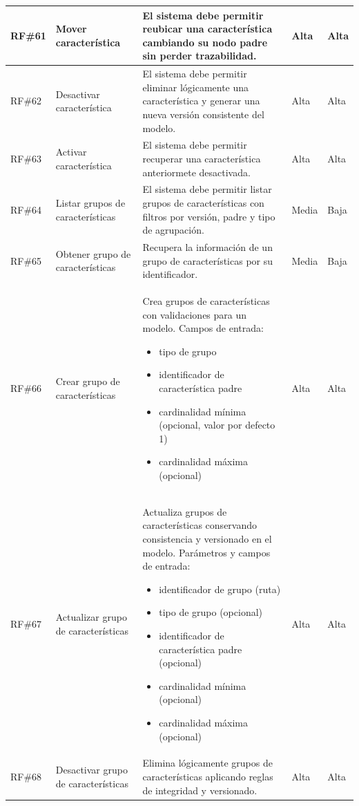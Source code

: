 \begin{longtable}{|p{1cm}|p{4cm}|p{5.2cm}|p{1.9cm}|p{1.9cm}|}
	\rowcolor[HTML]{EDEBF1}
	\ac{RF}\#61 & Mover característica & El sistema debe permitir reubicar una característica cambiando su nodo padre sin perder trazabilidad. & Alta & Alta \\
	\hline
	\ac{RF}\#62 & Desactivar característica & El sistema debe permitir eliminar lógicamente una característica y generar una nueva versión consistente del modelo. & Alta & Alta \\
	\hline
	\rowcolor[HTML]{EDEBF1}
	\ac{RF}\#63 & Activar característica & El sistema debe permitir recuperar una característica anteriormete desactivada. & Alta & Alta \\
	\hline
	\ac{RF}\#64 & Listar grupos de características & El sistema debe permitir listar grupos de características con filtros por versión, padre y tipo de agrupación. & Media & Baja \\
	\hline
	\rowcolor[HTML]{EDEBF1}
	\ac{RF}\#65 & Obtener grupo de características & Recupera la información de un grupo de características por su identificador. & Media & Baja \\
	\hline
	\ac{RF}\#66 & Crear grupo de características & Crea grupos de características con validaciones para un modelo. Campos de entrada:
		\begin{itemize}
			\item tipo de grupo
			\item identificador de característica padre
			\item cardinalidad mínima (opcional, valor por defecto 1)
			\item cardinalidad máxima (opcional)
		\end{itemize}
	& Alta & Alta \\
	\hline
	\rowcolor[HTML]{EDEBF1}
	\ac{RF}\#67 & Actualizar grupo de características & Actualiza grupos de características conservando consistencia y versionado en el modelo. Parámetros y campos de entrada:
		\begin{itemize}
			\item identificador de grupo (ruta)
			\item tipo de grupo (opcional)
			\item identificador de característica padre (opcional)
			\item cardinalidad mínima (opcional)
			\item cardinalidad máxima (opcional)
		\end{itemize}
	& Alta & Alta \\
	\hline
	\ac{RF}\#68 & Desactivar grupo de características & Elimina lógicamente grupos de características aplicando reglas de integridad y versionado. & Alta & Alta \\

\end{longtable}
